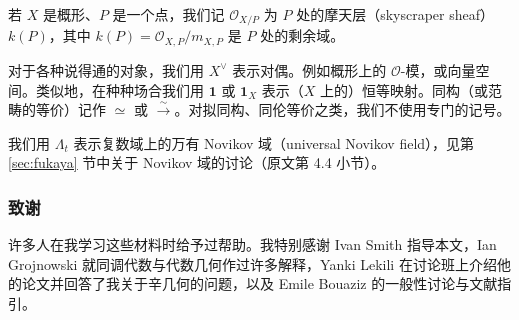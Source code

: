 
若 $X$ 是概形、$P$ 是一个点，我们记 $\mathcal{O}_{X/P}$ 为 $P$ 处的摩天层（skyscraper sheaf）$k(P)$，其中 $k(P)=\mathcal{O}_{X,P}/m_{X,P}$ 是 $P$ 处的剩余域。


对于各种说得通的对象，我们用 $X^\vee$ 表示对偶。例如概形上的 $\mathcal{O}$-模，或向量空间。类似地，在种种场合我们用 $\mathbf{1}$ 或 $\mathbf{1}_X$ 表示（$X$ 上的）恒等映射。同构（或范畴的等价）记作 $\simeq$ 或 $\xrightarrow{\sim}$。对拟同构、同伦等价之类，我们不使用专门的记号。

我们用 $\Lambda_t$ 表示复数域上的万有 Novikov 域（universal Novikov field），见第 \ref{sec:fukaya} 节中关于 Novikov 域的讨论（原文第 4.4 小节）。

\subsubsection*{致谢}

许多人在我学习这些材料时给予过帮助。我特别感谢 Ivan Smith 指导本文，Ian Grojnowski 就同调代数与代数几何作过许多解释，Yanki Lekili 在讨论班上介绍他的论文并回答了我关于辛几何的问题，以及 Emile Bouaziz 的一般性讨论与文献指引。
